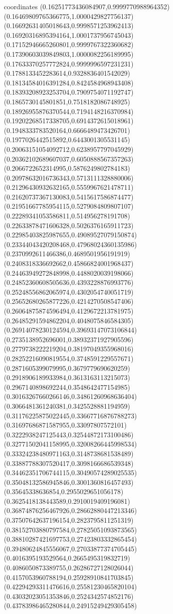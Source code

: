 coordinates {%
(0.16251773436084907,0.9999770988964352)
(0.16469809765366775,1.0000429827756137)
(0.16692631405018643,0.9998571253962413)
(0.16920316895394164,1.0001737956745043)
(0.17152946665260801,0.9999767322360682)
(0.17390603039849803,1.0000082256189995)
(0.17633370257772824,0.9999996597231231)
(0.1788133452283614,0.9328836401542029)
(0.18134584016391284,0.8424584968943408)
(0.18393208923253704,0.7909754071192747)
(0.1865730145801851,0.7518182086748925)
(0.18926955876370544,0.7194148216370984)
(0.19202268517338705,0.6914372615018961)
(0.1948333783520164,0.6666489473426701)
(0.1977026442515892,0.6443001305531145)
(0.20063151054092712,0.6238957797045929)
(0.20362102689607037,0.6050888567357263)
(0.2066722652314995,0.5876249802784183)
(0.20978632016736343,0.5713111328880006)
(0.21296430932632165,0.5559967621478711)
(0.21620737367130083,0.5415617586874477)
(0.21951667785954115,0.5279084809807107)
(0.22289341053586811,0.514956278191708)
(0.22633878471606328,0.5026376165911723)
(0.22985403825987655,0.49089527079150874)
(0.23344043420208468,0.47968024360135986)
(0.2370992611466386,0.4689501956191919)
(0.2408318336692662,0.45866824001968437)
(0.24463949272848998,0.4488020039198066)
(0.24852360608505636,0.4393228876993776)
(0.25248556862065974,0.4302054740051719)
(0.25652680265877226,0.4214270508547406)
(0.26064875874596494,0.4129672213781975)
(0.26485291594862204,0.4048075846584305)
(0.26914078230124594,0.39693147073106844)
(0.2735138952696001,0.38932371927905596)
(0.2779738222219204,0.38197049355968016)
(0.28252216090819554,0.3748591229557671)
(0.2871605399079995,0.3679779690620259)
(0.2918906189933984,0.3613163113215073)
(0.2967140898692244,0.3548642477154985)
(0.30163267660266146,0.34861260968636404)
(0.3066481361240381,0.3425528881194959)
(0.31176225875022445,0.33667716876788273)
(0.31697686871587955,0.33097807572101)
(0.3222938247125443,0.32544872173100486)
(0.32771502041158995,0.32008266445998534)
(0.33324238480971163,0.3148738681538489)
(0.33887788307520417,0.3098166686539348)
(0.34462351706744115,0.30490574289025535)
(0.35048132586945846,0.3001360816457493)
(0.35645338636854,0.2955029651056178)
(0.3625418138443589,0.2910019409196081)
(0.36874876256467926,0.28662880447213346)
(0.37507642637196154,0.2823795811251319)
(0.38152703880797584,0.27825051093873565)
(0.38810287421697753,0.27423803332865454)
(0.39480624845556067,0.27033877374705445)
(0.4016395193529564,0.2665495319832719)
(0.4086050873389755,0.26286727128026044)
(0.4157053960788194,0.25928910841703845)
(0.42294293311476616,0.25581230465820104)
(0.43032023051353846,0.2524342574852176)
(0.43783986465280844,0.24915249429305458)
}
